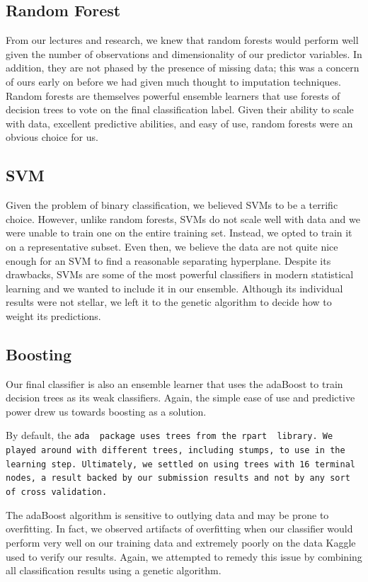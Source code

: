\documentclass[11pt, oneside]{article}   	%
\begin{document}
	\subsection{Random Forest}
	From our lectures
	and research, we knew that random forests would perform well given the number of
	observations and dimensionality of our predictor variables. In addition, they are not phased by the
	presence of missing data; this was a concern of ours early on before we had given much thought
	to imputation techniques. Random forests are themselves powerful ensemble learners that 
	use forests of decision trees to vote on the final classification label. Given their
	ability to scale with data, excellent predictive abilities, and easy of use, random forests were an obvious choice for us.
	
	\subsection{SVM}
	Given the problem of binary classification, we believed SVMs to be a terrific choice. 
	However, unlike random forests, SVMs do not scale well with data
	and we were unable to train one on the entire training set. Instead, we opted to train
	it on a representative subset. Even then, we believe the data are not quite nice enough
	for an SVM to find a reasonable separating hyperplane. Despite its drawbacks, SVMs
	are some of the most powerful classifiers in modern statistical learning and we wanted
	to include it in our ensemble. Although its individual results were not stellar,
	we left it to the genetic algorithm to decide how to weight its predictions.
	\subsection{Boosting}
	Our final classifier is also an ensemble learner that uses the adaBoost to train
	decision trees as its weak classifiers. Again, the simple ease of use and predictive
	power drew us towards boosting as a solution. 
	
	 By default, the \tt ada\rm~ package uses trees from the \tt rpart
	\rm~library. We played around with different trees, including stumps, to use in the learning step. 	Ultimately, we settled
	on using trees with 16 terminal nodes, a result backed by our submission results and not by
	any sort of cross validation.
	
	The adaBoost algorithm is sensitive to outlying data and may be prone to overfitting. In fact,
	we observed artifacts of overfitting when our classifier would perform very well on
	our training data and extremely poorly on the data Kaggle used to verify our results. 
	Again, we attempted to remedy this issue by combining all classification results using a 
	genetic algorithm.
\end{document}
